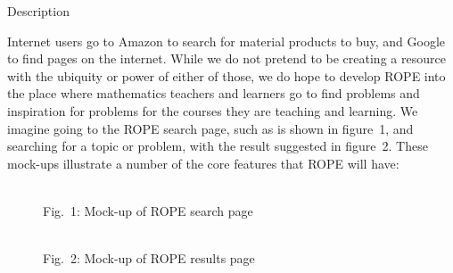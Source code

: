 \documentclass[11pt]{article}
\begin{document}
\begin{section}{Description}

Internet users go to Amazon to search for material products to buy, and
Google to find pages on the internet.  While we do not pretend to be
creating a resource with the ubiquity or power of either of those, we do 
hope to develop ROPE into the place where mathematics teachers and
learners go to find problems and inspiration for problems for the courses
they are teaching and learning.  We imagine going to the ROPE search page,
such as is shown in figure~1, and searching for a topic or problem, with
the result suggested in figure~2.  These mock-ups illustrate a number of
the core features that ROPE will have:

\begin{figure}
\begin{center}
\\
Fig.~1: Mock-up of ROPE search page
\end{center}
\end{figure}

\begin{figure}
\begin{center}
\\
Fig.~2: Mock-up of ROPE results page
\end{center}
\end{figure}


\end{section}
\end{document}

